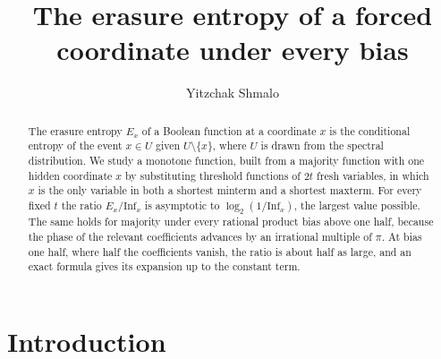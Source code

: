\documentclass[11pt]{amsart}
\title{The erasure entropy of a forced coordinate under every bias}
\author{Yitzchak Shmalo}
\date{}
\theoremstyle{remark}
\newcommand{\Inf}{\mathrm{Inf}}
\begin{document}
\begin{abstract}
The erasure entropy $E_x$ of a Boolean function at a coordinate $x$ is the conditional entropy of the event $x\in U$
given $U\setminus\{x\}$, where $U$ is drawn from the spectral distribution. We study a monotone function, built from a
majority function with one hidden coordinate $x$ by substituting threshold functions of $2t$ fresh variables, in which
$x$ is the only variable in both a shortest minterm and a shortest maxterm. For every fixed $t$ the ratio
$E_x/\Inf_x$ is asymptotic to $\log_2(1/\Inf_x)$, the largest value possible. The same holds for majority under every
rational product bias above one half, because the phase of the relevant coefficients advances by an irrational
multiple of $\pi$. At bias one half, where half the coefficients vanish, the ratio is about half as large, and an
exact formula gives its expansion up to the constant term.
\end{abstract}


\maketitle

\section{Introduction}\label{sec:intro}
\end{document}
